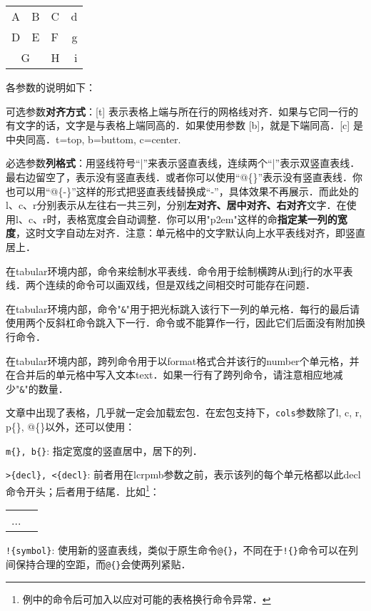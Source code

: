 \begin{codeshow}
\begin{center}
  \begin{tabular}[c]{|l|c||p{3em}
    r@{-}} \hline\hline
    A & B & C & d\\D & E & F & g\\
    \cline{1-2}
    \multicolumn{2}{|c|}{G}&H&i\\
    \hline
  \end{tabular}
\end{center}
\end{codeshow}

各参数的说明如下：
\begin{feai}
\item 可选参数\textbf{对齐方式}：[t] 表示表格上端与所在行的网格线对齐．如果与它同一行的有文字的话，文字是与表格上端同高的．如果使用参数 [b]，就是下端同高．[c] 是中央同高．t=top, b=buttom, c=center.
\item 必选参数\textbf{列格式}：用竖线符号“|”来表示竖直表线，连续两个“|”表示双竖直表线．最右边留空了，表示没有竖直表线．或者你可以使用“@\{\}”表示没有竖直表线．你也可以用“@\{-\}”这样的形式把竖直表线替换成“-”，具体效果不再展示．而此处的l、c、r分别表示从左往右一共三列，分别\textbf{左对齐、居中对齐、右对齐}文字．在使用l、c、r时，表格宽度会自动调整．你可以用"p{2em}"这样的命\textbf{指定某一列的宽度}，这时文字自动左对齐．注意：单元格中的文字默认向上水平表线对齐，即竖直居上．
\item 在tabular环境内部，命令来绘制水平表线．命令用于绘制横跨从i到j行的水平表线．两个连续的命令可以画双线，但是双线之间相交时可能存在问题．
\item 在tabular环境内部，命令"\texttt{\&}"用于把光标跳入该行下一列的单元格．每行的最后请使用两个反斜杠命令跳入下一行．命令或不能算作一行，因此它们后面没有附加换行命令．
\item 在tabular环境内部，跨列命令用于以format格式合并该行的number个单元格，并在合并后的单元格中写入文本text．如果一行有了跨列命令，请注意相应地减少"\texttt{\&}"的数量．
\end{feai}

文章中出现了表格，几乎就一定会加载宏包．在宏包支持下，\texttt{cols}参数除了l, c, r, p\{\}, @\{\}以外，还可以使用：
\begin{feai}
\item \texttt{m\{\}, b\{\}}: 指定宽度的竖直居中，居下的列．
\item \verb|>{decl}, <{decl}|: 前者用在lcrpmb参数之前，表示该列的每个单元格都以此decl命令开头；后者用于结尾．比如\footnote{例中的命令后可加入以应对可能的表格换行命令异常．}：
\begin{latex}
\begin{tabular}{|>{\centering\ttfamily}p{5em}
    |>{$}c<{$}|}
...
\end{tabular}
\end{latex}
\item \verb|!{symbol}|:  使用新的竖直表线，类似于原生命令\texttt{@\{\}}，不同在于\verb|!{}|命令可以在列间保持合理的空距，而\verb|@{}|会使两列紧贴．
\end{feai}

